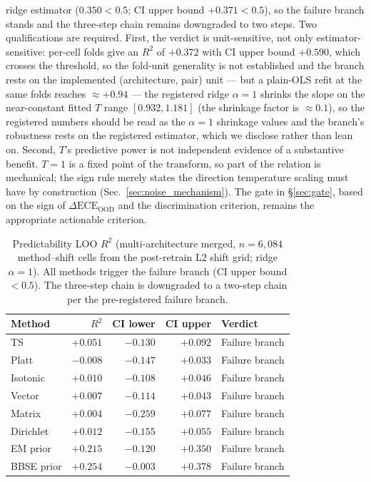 \documentclass[final,5p,times,nonatbib]{elsarticle}
\begin{document}
ridge estimator ($0.350 < 0.5$; CI upper bound $+0.371 < 0.5$), so
the failure branch stands and the three-step chain remains downgraded to
two steps. Two qualifications are required. First, the verdict is
unit-sensitive, not only estimator-sensitive: per-cell folds give an
$R^2$ of $+0.372$ with CI upper bound $+0.590$, which crosses the
threshold, so the fold-unit generality is not established and the
branch rests on the implemented (architecture, pair) unit --- but a plain-OLS
refit at the same folds reaches $\approx+0.94$ --- the registered
ridge $\alpha{=}1$ shrinks the slope on the near-constant fitted $T$
range $[0.932, 1.181]$ (the shrinkage factor is $\approx 0.1$), so the
registered numbers should be read as the $\alpha{=}1$ shrinkage values
and the branch's robustness rests on the registered estimator, which we
disclose rather than lean on. Second, $T$'s predictive power is not independent evidence
of a substantive benefit. $T=1$ is a fixed point of the transform, so
part of the relation is mechanical; the sign rule merely states the
direction temperature scaling must have by construction
(Sec.~\ref{sec:noise_mechanism}). The gate in \S\ref{sec:gate}, based on
the sign of $\Delta\text{ECE}_{\text{OOD}}$ and the discrimination
criterion, remains the appropriate actionable criterion.

\begin{table}[t]
\centering
\caption{Predictability LOO $R^2$ (multi-architecture merged,
$n=6{,}084$ method--shift cells from the post-retrain L2 shift grid;
ridge $\alpha{=}1$). All
methods trigger the failure branch (CI upper bound $<0.5$). The
three-step chain is downgraded to a two-step chain per the
pre-registered failure branch.}
\label{tab:predictability}
\begin{tabular}{lrrrl}
\toprule
Method & $R^2$ & CI lower & CI upper & Verdict \\
\midrule
TS         & $+0.051$ & $-0.130$ & $+0.092$ & Failure branch \\
Platt      & $-0.008$ & $-0.147$ & $+0.033$ & Failure branch \\
Isotonic   & $+0.010$ & $-0.108$ & $+0.046$ & Failure branch \\
Vector     & $+0.007$ & $-0.114$ & $+0.043$ & Failure branch \\
Matrix     & $+0.004$ & $-0.259$ & $+0.077$ & Failure branch \\
Dirichlet  & $+0.012$ & $-0.155$ & $+0.055$ & Failure branch \\
EM prior   & $+0.215$ & $-0.120$ & $+0.350$ & Failure branch \\
BBSE prior & $+0.254$ & $-0.003$ & $+0.378$ & Failure branch \\
\bottomrule
\end{tabular}
\end{table}
\end{document}
